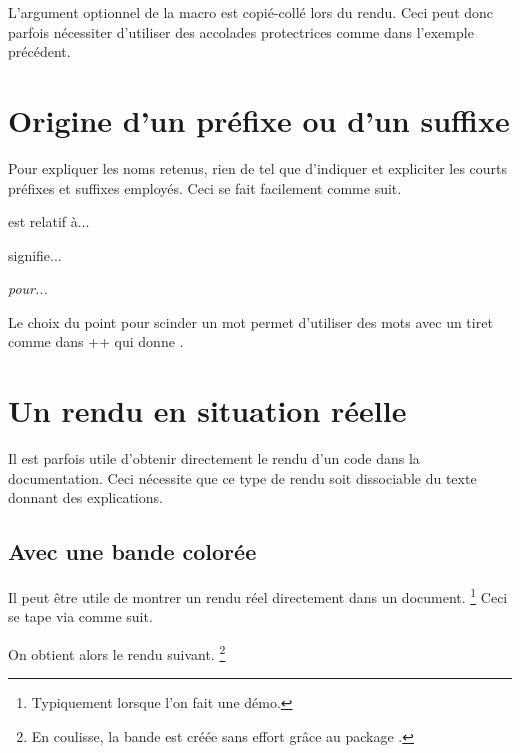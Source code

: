 \begin{tdocwarn}
    L'argument optionnel de la macro  est copié-collé lors du rendu. Ceci peut donc parfois nécessiter d'utiliser des accolades protectrices comme dans l'exemple précédent.
\end{tdocwarn}



\section{Origine d'un préfixe ou d'un suffixe}

Pour expliquer les noms retenus, rien de tel que d'indiquer et expliciter les courts préfixes et suffixes employés. Ceci se fait facilement comme suit.


\begin{tdoclatex}[sbs]
 est relatif à...

 signifie...

\emph{ pour...}
\end{tdoclatex}


\begin{tdocrem}
    Le choix du point pour scinder un mot permet d'utiliser des mots avec un tiret comme dans \tdocinlatex++ qui donne .
\end{tdocrem}


\section{Un rendu en situation réelle} \label{tdoc-showcase}

Il est parfois utile d'obtenir directement le rendu d'un code dans la documentation. Ceci nécessite que ce type de rendu soit dissociable du texte donnant des explications.



\subsection{Avec une bande colorée}

\begin{tdocexa}
    Il peut être utile de montrer un rendu réel directement dans un document.
    \footnote{
        Typiquement lorsque l'on fait une démo.
    }
    Ceci se tape via  comme suit.



    On obtient alors le rendu suivant.
    \footnote{
        En coulisse, la bande est créée sans effort grâce au package .
    }

    \medskip

    

\end{tdocexa}


